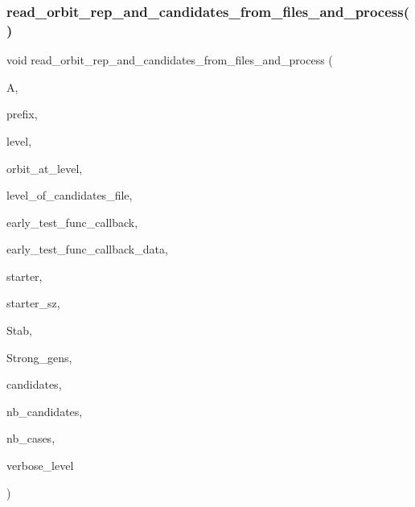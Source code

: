 \subsubsection{\texorpdfstring{read\+\_\+orbit\+\_\+rep\+\_\+and\+\_\+candidates\+\_\+from\+\_\+files\+\_\+and\+\_\+process()}{read\_orbit\_rep\_and\_candidates\_from\_files\_and\_process()}}
{\footnotesize\ttfamily void read\+\_\+orbit\+\_\+rep\+\_\+and\+\_\+candidates\+\_\+from\+\_\+files\+\_\+and\+\_\+process (\begin{DoxyParamCaption}\item[{\mbox{\hyperlink{classaction}{action}} $\ast$}]{A,  }\item[{\mbox{\hyperlink{galois_8h_ab6cc7b4aeb6ea31aba2b3fbfc83ff5e6}{B\+Y\+TE}} $\ast$}]{prefix,  }\item[{\mbox{\hyperlink{galois_8h_a09fddde158a3a20bd2dcadb609de11dc}{I\+NT}}}]{level,  }\item[{\mbox{\hyperlink{galois_8h_a09fddde158a3a20bd2dcadb609de11dc}{I\+NT}}}]{orbit\+\_\+at\+\_\+level,  }\item[{\mbox{\hyperlink{galois_8h_a09fddde158a3a20bd2dcadb609de11dc}{I\+NT}}}]{level\+\_\+of\+\_\+candidates\+\_\+file,  }\item[{void($\ast$)(\mbox{\hyperlink{galois_8h_a09fddde158a3a20bd2dcadb609de11dc}{I\+NT}} $\ast$\mbox{\hyperlink{simeon_8_c_adab47f8243f1b5a2c31df2535d6b37d0}{S}}, \mbox{\hyperlink{galois_8h_a09fddde158a3a20bd2dcadb609de11dc}{I\+NT}} len, \mbox{\hyperlink{galois_8h_a09fddde158a3a20bd2dcadb609de11dc}{I\+NT}} $\ast$candidates, \mbox{\hyperlink{galois_8h_a09fddde158a3a20bd2dcadb609de11dc}{I\+NT}} nb\+\_\+candidates, \mbox{\hyperlink{galois_8h_a09fddde158a3a20bd2dcadb609de11dc}{I\+NT}} $\ast$good\+\_\+candidates, \mbox{\hyperlink{galois_8h_a09fddde158a3a20bd2dcadb609de11dc}{I\+NT}} \&nb\+\_\+good\+\_\+candidates, void $\ast$data, \mbox{\hyperlink{galois_8h_a09fddde158a3a20bd2dcadb609de11dc}{I\+NT}} \mbox{\hyperlink{simeon_8_c_a818073fbcc2f439e7c56952f67386122}{verbose\+\_\+level}})}]{early\+\_\+test\+\_\+func\+\_\+callback,  }\item[{void $\ast$}]{early\+\_\+test\+\_\+func\+\_\+callback\+\_\+data,  }\item[{\mbox{\hyperlink{galois_8h_a09fddde158a3a20bd2dcadb609de11dc}{I\+NT}} $\ast$\&}]{starter,  }\item[{\mbox{\hyperlink{galois_8h_a09fddde158a3a20bd2dcadb609de11dc}{I\+NT}} \&}]{starter\+\_\+sz,  }\item[{\mbox{\hyperlink{classsims}{sims}} $\ast$\&}]{Stab,  }\item[{\mbox{\hyperlink{classstrong__generators}{strong\+\_\+generators}} $\ast$\&}]{Strong\+\_\+gens,  }\item[{\mbox{\hyperlink{galois_8h_a09fddde158a3a20bd2dcadb609de11dc}{I\+NT}} $\ast$\&}]{candidates,  }\item[{\mbox{\hyperlink{galois_8h_a09fddde158a3a20bd2dcadb609de11dc}{I\+NT}} \&}]{nb\+\_\+candidates,  }\item[{\mbox{\hyperlink{galois_8h_a09fddde158a3a20bd2dcadb609de11dc}{I\+NT}} \&}]{nb\+\_\+cases,  }\item[{\mbox{\hyperlink{galois_8h_a09fddde158a3a20bd2dcadb609de11dc}{I\+NT}}}]{verbose\+\_\+level }\end{DoxyParamCaption})}

